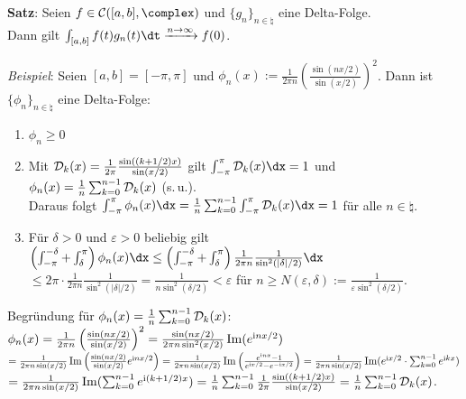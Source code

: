 \linie

\textbf{Satz}:
Seien $f \in \C([a, b], \complex)$ und $\{g_n\}_{n \in \natural}$
eine Delta-Folge.\\
Dann gilt $\int_{[a, b]} f(t)g_n(t) \dt \xrightarrow{n \to \infty} f(0)$.

\linie

\emph{Beispiel}:
Seien $[a, b] = [-\pi, \pi]$ und $\phi_n(x) :=
\frac{1}{2\pi n} \left(\frac{\sin(nx/2)}{\sin(x/2)}\right)^2$.
Dann ist $\{\phi_n\}_{n \in \natural}$ eine Delta-Folge:
\begin{enumerate}
    \item
    $\phi_n \ge 0$

    \item
    Mit $\mathcal{D}_k(x) = \frac{1}{2\pi} \frac{\sin((k + 1/2)x)}{\sin(x/2)}$
    gilt $\int_{-\pi}^\pi \D_k(x) \dx = 1$ und
    $\phi_n(x) = \frac{1}{n} \sum_{k=0}^{n-1} \mathcal{D}_k(x)$ (s.\,u.).\\
    Daraus folgt $\int_{-\pi}^\pi \phi_n(x)\dx =
    \frac{1}{n} \sum_{k=0}^{n-1} \int_{-\pi}^\pi \D_k(x) \dx = 1$
    für alle $n \in \natural$.

    \item
    Für $\delta > 0$ und $\varepsilon > 0$ beliebig gilt
    $\left(\int_{-\pi}^{-\delta} + \int_\delta^\pi\right) \phi_n(x)\dx \le
    \left(\int_{-\pi}^{-\delta} + \int_\delta^\pi\right)
    \frac{1}{2\pi n} \frac{1}{\sin^2(|\delta|/2)} \dx$\\
    $\le 2\pi \cdot \frac{1}{2\pi n} \frac{1}{\sin^2(|\delta|/2)} =
    \frac{1}{n \sin^2(\delta/2)} < \varepsilon$
    für $n \ge N(\varepsilon, \delta) :=
    \frac{1}{\varepsilon \sin^2(\delta/2)}$.
\end{enumerate}

\linie

Begründung für $\phi_n(x) = \frac{1}{n} \sum_{k=0}^{n-1} \mathcal{D}_k(x)$:
$\phi_n(x) = \frac{1}{2\pi n} \left(\frac{\sin(nx/2)}{\sin(x/2)}\right)^2 =
\frac{\sin(nx/2)}{2\pi n \sin^2(x/2)} \operatorname{Im}(e^{\mathrm{i} nx/2})$\\
$= \frac{1}{2\pi n \sin(x/2)}
\operatorname{Im}\left(\frac{\sin(nx/2)}{\sin(x/2)} e^{\mathrm{i} nx/2}\right) =
\frac{1}{2\pi n \sin(x/2)}
\operatorname{Im}\left(\frac{e^{\mathrm{i} nx} - 1}{e^{\mathrm{i} x/2} - e^{-\mathrm{i} x/2}}\right) =
\frac{1}{2\pi n \sin(x/2)} \operatorname{Im}(e^{\mathrm{i} x/2} \cdot \sum_{k=0}^{n-1} e^{\mathrm{i} kx})$\\
$= \frac{1}{2\pi n \sin(x/2)} \operatorname{Im}(\sum_{k=0}^{n-1} e^{\mathrm{i} (k + 1/2)x}) =
\frac{1}{n} \sum_{k=0}^{n-1} \frac{1}{2\pi}
\frac{\sin((k + 1/2)x)}{\sin(x/2)} =
\frac{1}{n} \sum_{k=0}^{n-1} \mathcal{D}_k(x)$.

